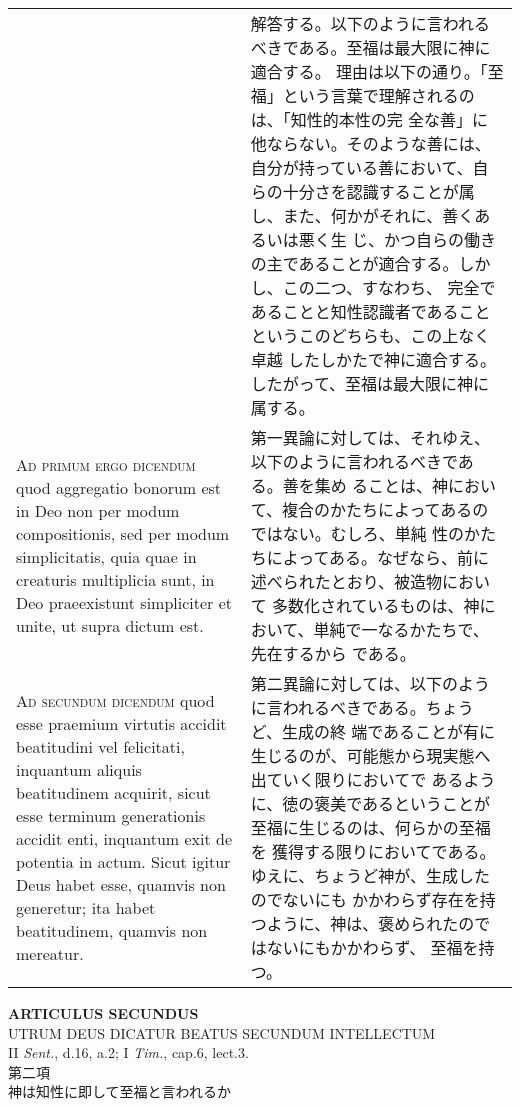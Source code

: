 \documentclass[10pt]{jsarticle} %
\begin{document}
\begin{longtable}{p{21em}p{21em}}
&

解答する。以下のように言われるべきである。至福は最大限に神に適合する。
理由は以下の通り。「至福」という言葉で理解されるのは、「知性的本性の完
全な善」に他ならない。そのような善には、自分が持っている善において、自
らの十分さを認識することが属し、また、何かがそれに、善くあるいは悪く生
じ、かつ自らの働きの主であることが適合する。しかし、この二つ、すなわち、
完全であることと知性認識者であることというこのどちらも、この上なく卓越
したしかたで神に適合する。したがって、至福は最大限に神に属する。


\\



{\scshape Ad primum ergo dicendum} quod aggregatio bonorum est in Deo non per modum
compositionis, sed per modum simplicitatis, quia quae in creaturis
multiplicia sunt, in Deo praeexistunt simpliciter et unite, ut supra
dictum est.

&

第一異論に対しては、それゆえ、以下のように言われるべきである。善を集め
ることは、神において、複合のかたちによってあるのではない。むしろ、単純
性のかたちによってある。なぜなら、前に述べられたとおり、被造物において
多数化されているものは、神において、単純で一なるかたちで、先在するから
である。


\\



{\scshape Ad secundum dicendum} quod esse praemium virtutis accidit beatitudini vel
felicitati, inquantum aliquis beatitudinem acquirit, sicut esse terminum
generationis accidit enti, inquantum exit de potentia in actum. Sicut
igitur Deus habet esse, quamvis non generetur; ita habet beatitudinem,
quamvis non mereatur.

&

第二異論に対しては、以下のように言われるべきである。ちょうど、生成の終
端であることが有に生じるのが、可能態から現実態へ出ていく限りにおいてで
あるように、徳の褒美であるということが至福に生じるのは、何らかの至福を
獲得する限りにおいてである。ゆえに、ちょうど神が、生成したのでないにも
かかわらず存在を持つように、神は、褒められたのではないにもかかわらず、
至福を持つ。



\end{longtable}

\newpage


\begin{center}
 {\Large {\bf ARTICULUS SECUNDUS}}\\
 {\large UTRUM DEUS DICATUR BEATUS SECUNDUM INTELLECTUM}\\
 {\footnotesize II {\itshape Sent.}, d.16, a.2; I {\itshape Tim.},
 cap.6, lect.3.}\\
 {\Large 第二項\\神は知性に即して至福と言われるか}
\end{center}
\end{document}
